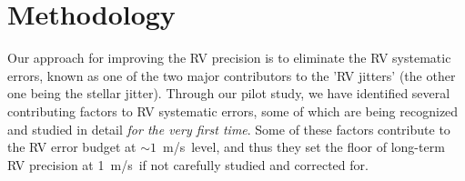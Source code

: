 \documentclass[12pt]{article}
\def\mps{m/s}
\def\kepler{{\it Kepler}}
\begin{document}

\vspace{-3pt}
\section{Methodology}

Our approach for improving the RV precision is to eliminate the RV
systematic errors, known as one of the two major contributors to the
'RV jitters' (the other one being the stellar jitter). Through our
pilot study, we have identified several contributing factors to RV
systematic errors, some of which are being recognized and studied in
detail \textit{for the very first time}. Some of these factors
contribute to the RV error budget at $\sim 1$~\mps\ level, and thus
they set the floor of long-term RV precision at 1~\mps\ if not
carefully studied and corrected for.
\end{document}
